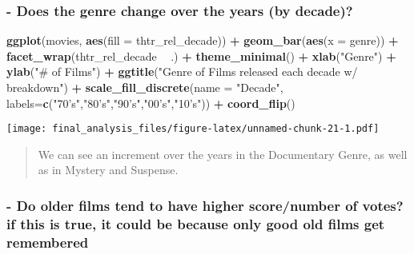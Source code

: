 \documentclass[]{article}
\newenvironment{Shaded}{\begin{snugshade}}{\end{snugshade}}
\newcommand{\DataTypeTok}[1]{\textcolor[rgb]{0.13,0.29,0.53}{#1}}
\newcommand{\KeywordTok}[1]{\textcolor[rgb]{0.13,0.29,0.53}{\textbf{#1}}}
\newcommand{\NormalTok}[1]{#1}
\newcommand{\OperatorTok}[1]{\textcolor[rgb]{0.81,0.36,0.00}{\textbf{#1}}}
\newcommand{\StringTok}[1]{\textcolor[rgb]{0.31,0.60,0.02}{#1}}
\begin{document}
\hypertarget{does-the-genre-change-over-the-years-by-decade}{%
\subsubsection{- Does the genre change over the years (by
decade)?}\label{does-the-genre-change-over-the-years-by-decade}}

\begin{Shaded}
\begin{Highlighting}[]
\KeywordTok{ggplot}\NormalTok{(movies, }\KeywordTok{aes}\NormalTok{(}\DataTypeTok{fill =}\NormalTok{ thtr_rel_decade)) }\OperatorTok{+}\StringTok{ }\KeywordTok{geom_bar}\NormalTok{(}\KeywordTok{aes}\NormalTok{(}\DataTypeTok{x =}\NormalTok{ genre)) }\OperatorTok{+}\StringTok{ }\KeywordTok{facet_wrap}\NormalTok{(thtr_rel_decade }\OperatorTok{~}\StringTok{ }\NormalTok{.) }\OperatorTok{+}\StringTok{ }\KeywordTok{theme_minimal}\NormalTok{() }\OperatorTok{+}\StringTok{ }\KeywordTok{xlab}\NormalTok{(}\StringTok{"Genre"}\NormalTok{) }\OperatorTok{+}\StringTok{ }\KeywordTok{ylab}\NormalTok{(}\StringTok{"# of Films"}\NormalTok{) }\OperatorTok{+}\StringTok{ }\KeywordTok{ggtitle}\NormalTok{(}\StringTok{"Genre of Films released each decade w/ breakdown"}\NormalTok{) }\OperatorTok{+}\StringTok{ }\KeywordTok{scale_fill_discrete}\NormalTok{(}\DataTypeTok{name =} \StringTok{"Decade"}\NormalTok{, }\DataTypeTok{labels=}\KeywordTok{c}\NormalTok{(}\StringTok{"70's"}\NormalTok{,}\StringTok{"80's"}\NormalTok{,}\StringTok{"90's"}\NormalTok{,}\StringTok{"00's"}\NormalTok{,}\StringTok{"10's"}\NormalTok{)) }\OperatorTok{+}\StringTok{ }\KeywordTok{coord_flip}\NormalTok{()}
\end{Highlighting}
\end{Shaded}

\texttt{[image: final\_analysis\_files/figure-latex/unnamed-chunk-21-1.pdf]}

\begin{quote}
We can see an increment over the years in the Documentary Genre, as well
as in Mystery and Suspense.
\end{quote}

\hypertarget{do-older-films-tend-to-have-higher-scorenumber-of-votes-if-this-is-true-it-could-be-because-only-good-old-films-get-remembered}{%
\subsubsection{- Do older films tend to have higher score/number of
votes? if this is true, it could be because only good old films get
remembered}\label{do-older-films-tend-to-have-higher-scorenumber-of-votes-if-this-is-true-it-could-be-because-only-good-old-films-get-remembered}}
\end{document}
